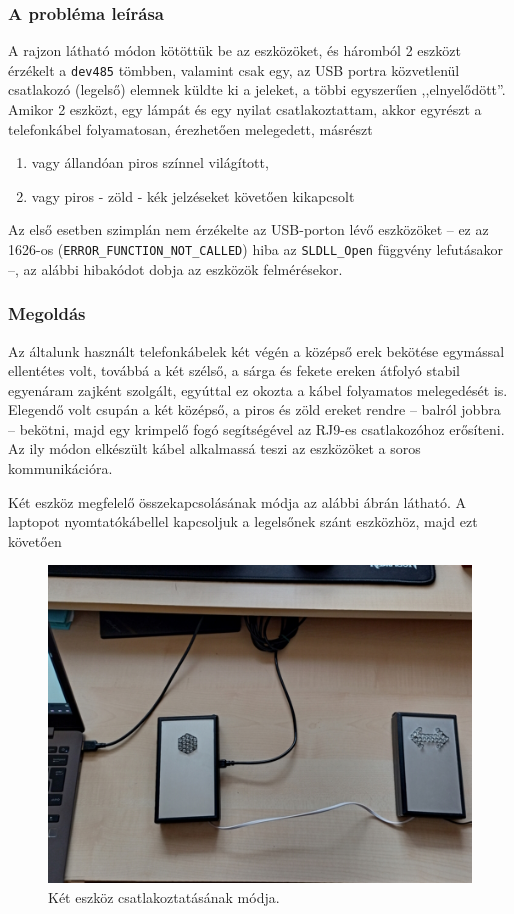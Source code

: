 \documentclass[tocnopagenum]{thesis-ekf}
\begin{document}
	\subsubsection{A probléma leírása}
	A rajzon látható módon kötöttük be az eszközöket, és háromból 2 eszközt érzékelt a \verb*|dev485| tömbben, valamint csak egy, az USB portra közvetlenül csatlakozó (legelső) elemnek küldte ki a jeleket, a többi egyszerűen ,,elnyelődött''.
	Amikor 2 eszközt, egy lámpát és egy nyilat csatlakoztattam, akkor egyrészt a telefonkábel folyamatosan, érezhetően melegedett, másrészt 
	\renewcommand{\labelenumi}{\alph{enumi})}
	\begin{enumerate}
		\item vagy állandóan piros színnel világított, 
		\item vagy piros - zöld - kék jelzéseket követően kikapcsolt
	\end{enumerate}
	Az első esetben szimplán nem érzékelte az USB-porton lévő eszközöket -- ez az 1626-os (\verb*|ERROR_FUNCTION_NOT_CALLED|) hiba az \verb*|SLDLL_Open| függvény lefutásakor --, az alábbi hibakódot dobja az eszközök felmérésekor.
	\subsubsection{Megoldás} Az általunk használt telefonkábelek két végén a középső erek bekötése egymással ellentétes volt, továbbá a két szélső, a sárga és fekete ereken átfolyó stabil egyenáram zajként szolgált, egyúttal ez okozta a kábel folyamatos melegedését is. Elegendő volt csupán a két középső, a piros és zöld ereket rendre -- balról jobbra --  bekötni, majd egy krimpelő fogó segítségével az RJ9-es csatlakozóhoz erősíteni. Az ily módon elkészült kábel alkalmassá teszi az eszközöket a soros kommunikációra.

	Két eszköz megfelelő összekapcsolásának módja az alábbi ábrán látható. A laptopot nyomtatókábellel kapcsoljuk a legelsőnek szánt eszközhöz, majd ezt követően 
	\begin{figure}[h!]
		\centering
		\includegraphics[scale=0.5]{images/foto_sorbakotes.jpg}
		\caption{Két eszköz csatlakoztatásának módja.}
		\label{fig:foto_sorbakotes}
	\end{figure}
	
\end{document}

